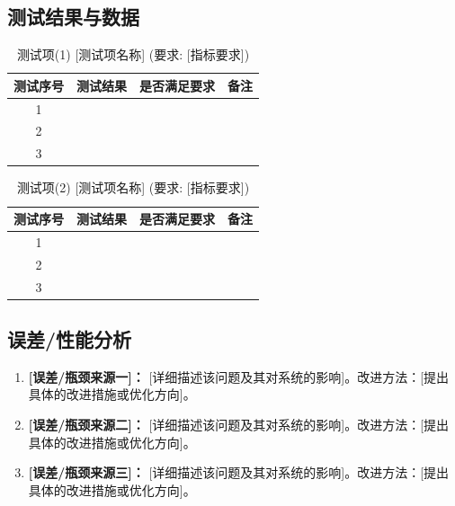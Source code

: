 \documentclass[zihao=-4,fontset=none]{ctexart}
\begin{document}
\subsection{测试结果与数据}
    \begin{table}[H]
        \centering
        \caption{测试项(1) [测试项名称] (要求: [指标要求])}
        \label{tab:task1}
        \begin{tabular}{cccc}
            \toprule
            测试序号 & 测试结果 & 是否满足要求 & 备注 \\
            \midrule
            1 & & & \\
            2 & & & \\
            3 & & & \\
            \bottomrule
        \end{tabular}
    \end{table}

    \begin{table}[H]
        \centering
        \caption{测试项(2) [测试项名称] (要求: [指标要求])}
        \label{tab:task2}
        \begin{tabular}{cccc}
            \toprule
            测试序号 & 测试结果 & 是否满足要求 & 备注 \\
            \midrule
            1 & & & \\
            2 & & & \\
            3 & & & \\
            \bottomrule
        \end{tabular}
    \end{table}
    

\subsection{误差/性能分析}
    \begin{enumerate}
        \item \textbf{[误差/瓶颈来源一]：} [详细描述该问题及其对系统的影响]。改进方法：[提出具体的改进措施或优化方向]。
        \item \textbf{[误差/瓶颈来源二]：} [详细描述该问题及其对系统的影响]。改进方法：[提出具体的改进措施或优化方向]。
        \item \textbf{[误差/瓶颈来源三]：} [详细描述该问题及其对系统的影响]。改进方法：[提出具体的改进措施或优化方向]。
    \end{enumerate}
\end{document}
